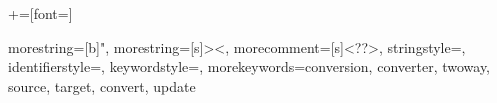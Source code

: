 
\newcommand{\lstinlineabstract}[1]{\lstinline[emph={#1},emphstyle=\textit, breaklines = true]~#1~}

\newcommand{\TODO}[1]{\textcolor{Mulberry}{\textbf{TODO:#1}}}

\newcommand{\lstinln}[1]{{\small\texttt{#1}}}
+=[font=\sffamily]
\newcommand{\zamk}{\textit{\texttt{zamk}}\xspace}
\newcommand{\gluer}{\textit{Gluer}\xspace}



{
  morestring=[b]",
  morestring=[s]{>}{<},
  morecomment=[s]{<?}{?>},
  stringstyle=\color{black},
  identifierstyle=\color{darkblue},
  keywordstyle=\color{cyan},
  morekeywords={conversion, converter, twoway, source, target, convert, update}%
}